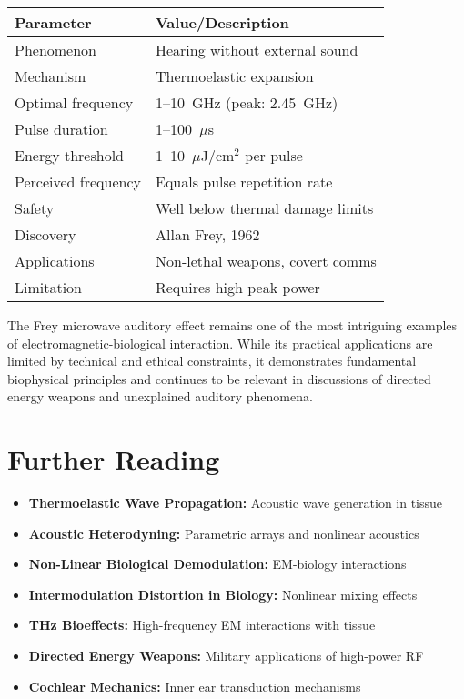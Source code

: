 \begin{center}
\begin{tabular}{@{}ll@{}}
\toprule
\textbf{Parameter} & \textbf{Value/Description} \\
\midrule
Phenomenon & Hearing without external sound \\
Mechanism & Thermoelastic expansion \\
Optimal frequency & 1--10~GHz (peak: 2.45~GHz) \\
Pulse duration & 1--100~$\mu$s \\
Energy threshold & 1--10~$\mu$J/cm$^2$ per pulse \\
Perceived frequency & Equals pulse repetition rate \\
Safety & Well below thermal damage limits \\
Discovery & Allan Frey, 1962 \\
Applications & Non-lethal weapons, covert comms \\
Limitation & Requires high peak power \\
\bottomrule
\end{tabular}
\end{center}

The Frey microwave auditory effect remains one of the most intriguing examples of electromagnetic-biological interaction. While its practical applications are limited by technical and ethical constraints, it demonstrates fundamental biophysical principles and continues to be relevant in discussions of directed energy weapons and unexplained auditory phenomena.

\section{Further Reading}

\begin{itemize}
\item \textbf{Thermoelastic Wave Propagation:} Acoustic wave generation in tissue
\item \textbf{Acoustic Heterodyning:} Parametric arrays and nonlinear acoustics
\item \textbf{Non-Linear Biological Demodulation:} EM-biology interactions
\item \textbf{Intermodulation Distortion in Biology:} Nonlinear mixing effects
\item \textbf{THz Bioeffects:} High-frequency EM interactions with tissue
\item \textbf{Directed Energy Weapons:} Military applications of high-power RF
\item \textbf{Cochlear Mechanics:} Inner ear transduction mechanisms
\end{itemize}

